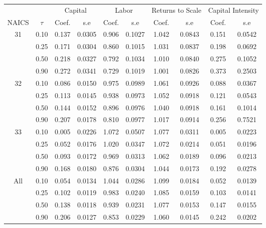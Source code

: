 \begin{table}[H]
\centering
\begin{tabular}{cccccccccc}
  \hline\hline & & \multicolumn{2}{c}{Capital}  & \multicolumn{2}{c}{Labor} & \multicolumn{2}{c}{Returns to Scale} & \multicolumn{2}{c}{Capital Intensity}\\ \cmidrule(lr){3-4} \cmidrule(lr){5-6} \cmidrule(lr){7-8} \cmidrule(lr){9-10}NAICS & $\tau$ & Coef. & s.e & Coef. & s.e & Coef. & s.e & Coef. & s.e \\ 
  \hline
31 & 0.10 & 0.137 & 0.0305 & 0.906 & 0.1027 & 1.042 & 0.0843 & 0.151 & 0.0542 \\ 
   & 0.25 & 0.171 & 0.0304 & 0.860 & 0.1015 & 1.031 & 0.0837 & 0.198 & 0.0692 \\ 
   & 0.50 & 0.218 & 0.0327 & 0.792 & 0.1034 & 1.010 & 0.0840 & 0.275 & 0.1052 \\ 
   & 0.90 & 0.272 & 0.0341 & 0.729 & 0.1019 & 1.001 & 0.0826 & 0.373 & 0.2503 \\ 
  32 & 0.10 & 0.086 & 0.0150 & 0.975 & 0.0989 & 1.061 & 0.0926 & 0.088 & 0.0367 \\ 
   & 0.25 & 0.113 & 0.0145 & 0.938 & 0.0973 & 1.052 & 0.0918 & 0.121 & 0.0543 \\ 
   & 0.50 & 0.144 & 0.0152 & 0.896 & 0.0976 & 1.040 & 0.0918 & 0.161 & 0.1014 \\ 
   & 0.90 & 0.207 & 0.0178 & 0.810 & 0.0977 & 1.017 & 0.0914 & 0.256 & 0.7521 \\ 
  33 & 0.10 & 0.005 & 0.0226 & 1.072 & 0.0507 & 1.077 & 0.0311 & 0.005 & 0.0223 \\ 
   & 0.25 & 0.052 & 0.0176 & 1.020 & 0.0347 & 1.072 & 0.0214 & 0.051 & 0.0196 \\ 
   & 0.50 & 0.093 & 0.0172 & 0.969 & 0.0313 & 1.062 & 0.0189 & 0.096 & 0.0213 \\ 
   & 0.90 & 0.168 & 0.0180 & 0.876 & 0.0304 & 1.044 & 0.0173 & 0.192 & 0.0278 \\ 
  All & 0.10 & 0.054 & 0.0134 & 1.044 & 0.0286 & 1.099 & 0.0184 & 0.052 & 0.0139 \\ 
   & 0.25 & 0.102 & 0.0119 & 0.983 & 0.0240 & 1.085 & 0.0159 & 0.103 & 0.0141 \\ 
   & 0.50 & 0.138 & 0.0118 & 0.939 & 0.0231 & 1.077 & 0.0153 & 0.147 & 0.0155 \\ 
   & 0.90 & 0.206 & 0.0127 & 0.853 & 0.0229 & 1.060 & 0.0145 & 0.242 & 0.0202 \\ 
   \hline
\end{tabular}
\end{table}
